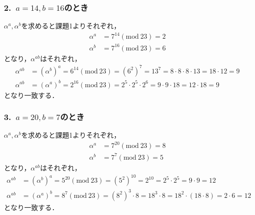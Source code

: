 \documentclass[a4paper,12pt]{jarticle}
\begin{document}
\subsubsection*{2.~$a=14,b=16$のとき}
\vspace{-4mm}
$\alpha^a,\alpha^b$を求めると課題1よりそれぞれ，
%
\begin{align}
 \alpha^a&=7^{14}(\mathrm{mod}~23)=2 \\
 \alpha^b&=7^{16}(\mathrm{mod}~23)=6
\end{align}
%
となり，$\alpha^{ab}$はそれぞれ，
%
\begin{align}
 \alpha^{ab}&=(\alpha^b)^a=6^{14}(\mathrm{mod}~23)=(6^2)^7=13^7=8\cdot8\cdot8\cdot13=18\cdot12=9\\
 \alpha^{ab}&=(\alpha^a)^b=2^{16}(\mathrm{mod}~23)=2^5\cdot2^5\cdot2^6=9\cdot9\cdot18=12\cdot18=9
\end{align}
%
となり一致する．
\vspace{-6mm}
\subsubsection*{3.~$a=20,b=7$のとき}
\vspace{-4mm}
$\alpha^a,\alpha^b$を求めると課題1よりそれぞれ，
%
\begin{align}
 \alpha^a&=7^{20}(\mathrm{mod}~23)=8 \\
 \alpha^b&=7^{7}(\mathrm{mod}~23)=5
\end{align}
%
となり，$\alpha^{ab}$はそれぞれ，
%
\begin{align}
 \alpha^{ab}&=(\alpha^b)^a=5^{20}(\mathrm{mod}~23)=(5^2)^{10}=2^{10}=2^5\cdot2^5=9\cdot9=12\\
 \alpha^{ab}&=(\alpha^a)^b=8^7(\mathrm{mod}~23)=(8^2)^3\cdot8=18^3\cdot8=18^2\cdot(18\cdot8)=2\cdot6=12
\end{align}
%
となり一致する．
\end{document}
